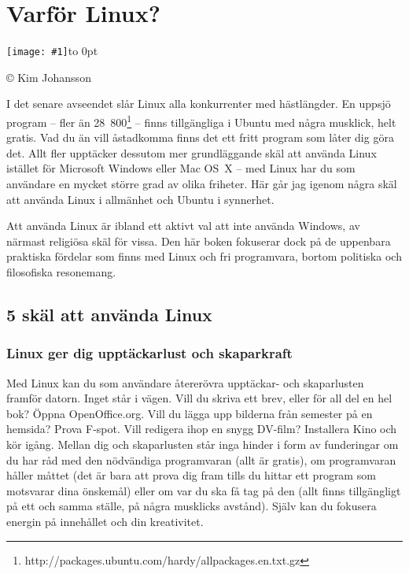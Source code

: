 \documentclass[a4paper,final]{memoir} %
\newcommand\xpackagecount{28~800} %
\newcommand{\xrcredit}[1]{\hbox to 0pt{\hspace*{.6\baselineskip}\begin{rotate}{90}{\usefont{T1}{phv}{m}{n}\selectfont\tiny #1}\end{rotate}}}
\newcommand\xintropic[1]{{\texttt{[image: \#1]}\xrcredit{\copyright{} Kim Johansson}}\medskip}
\newcommand\xchapter[2]{\chapter{#2}\begin{center}\xintropic{#1}\end{center}}
\begin{document}
\tableofcontents* %

\mainmatter

\xchapter{bilder804-all/Varfor_Linux}{Varför Linux?}\label{cha:hej}



I det senare avseendet slår Linux alla konkurrenter med hästlängder. En uppsjö program -- fler än \xpackagecount{}\footnote{http://packages.ubuntu.com/hardy/allpackages.en.txt.gz}  -- finns tillgängliga i Ubuntu med några musklick, helt gratis. Vad du än vill åstadkomma finns det ett fritt program som låter dig göra det. Allt fler upptäcker dessutom mer grundläggande skäl att använda Linux istället för Microsoft Windows eller Mac OS~X -- med Linux har du som användare en mycket större grad av olika friheter. Här går jag igenom några skäl att använda Linux i allmänhet och Ubuntu i synnerhet.

Att använda Linux är ibland ett aktivt val att inte använda Windows, av närmast religiösa skäl för vissa. Den här boken fokuserar dock på de uppenbara praktiska fördelar som finns med Linux och fri programvara, bortom politiska och filosofiska resonemang.


\section{5 skäl att använda Linux}

\subsection{Linux ger dig upptäckarlust och skaparkraft}

Med Linux kan du som användare återerövra upptäckar- och skaparlusten framför datorn. Inget står i vägen. Vill du skriva ett brev, eller för all del en hel bok? Öppna OpenOffice.org. Vill du lägga upp bilderna från semester på en hemsida? Prova F-spot. Vill redigera ihop en snygg DV-film? Installera Kino och kör igång. Mellan dig och skaparlusten står inga hinder i form av funderingar om du har råd med den nödvändiga programvaran (allt är gratis), om programvaran håller måttet (det är bara att prova dig fram tills du hittar ett program som motsvarar dina önskemål) eller om var du ska få tag på den (allt finns tillgängligt på ett och samma ställe, på några musklicks avstånd). Själv kan du fokusera energin på innehållet och din kreativitet.
\end{document}
